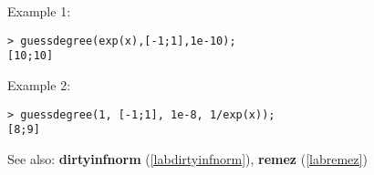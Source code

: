 \noindent Example 1: 
\begin{center}\begin{minipage}{15cm}\begin{Verbatim}[frame=single]
> guessdegree(exp(x),[-1;1],1e-10);
[10;10]
\end{Verbatim}
\end{minipage}\end{center}
\noindent Example 2: 
\begin{center}\begin{minipage}{15cm}\begin{Verbatim}[frame=single]
> guessdegree(1, [-1;1], 1e-8, 1/exp(x));
[8;9]
\end{Verbatim}
\end{minipage}\end{center}
See also: \textbf{dirtyinfnorm} (\ref{labdirtyinfnorm}), \textbf{remez} (\ref{labremez})
